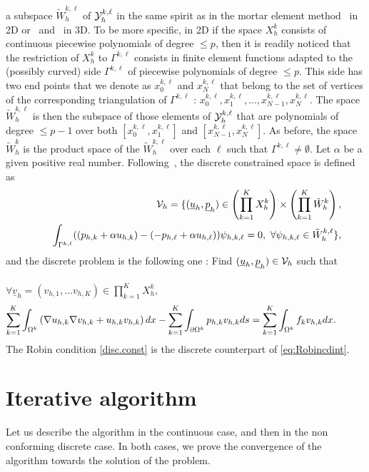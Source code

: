 \documentclass[final]{siamltex}
\begin{document}
a subspace $\tilde W_h^{k,\ell}$ of ${\cal Y}_h^{k,\ell}$ in the same
spirit as in the mortar element method~\cite{BMP} in 2D or~\cite{BBM}
and~\cite{BraessDahmen} in 3D.  To be more
specific, in 2D if the space $X_h^k$ consists of continuous piecewise
polynomials of degree $\le p$, then it is readily noticed that the
restriction of $X_h^k$ to $\Gamma^{k,\ell}$ consists in finite element
functions adapted to the (possibly curved) side $\Gamma^{k,\ell}$ of
piecewise polynomials of degree $\le p$. This side has two end points
that we denote as $x_0^{k,\ell}$ and $x_N^{k,\ell}$ that belong to the
set of vertices of the corresponding triangulation of
$\Gamma^{k,\ell}$ : $x_0^{k,\ell}, x_1^{k,\ell},...,x_{N-1}^{k,\ell},
x_N^{k,\ell}$. The space $\tilde W_h^{k,\ell}$ is then the subspace of
those elements of ${\cal Y}_h^{k,\ell}$ that are polynomials of degree
$\le p-1$ over both $[x_0^{k,\ell}, x_1^{k,\ell}]$ and
$[x_{N-1}^{k,\ell}, x_N^{k,\ell}]$.  As before, the space $\tilde
W_h^{k}$ is the product space of the $\tilde W_h^{k,\ell}$ over each
$\ell$ such that $\Gamma^{k,\ell}\not=\emptyset$.  
Let $\alpha$ be a given positive  real number.
Following~\cite{JMN10}, the discrete constrained space is defined as
\begin{eqnarray}
\label{disc.const}
{\cal V}_h =  {\displaystyle}\lbrace({{\underline u}}_h,{{\underline p}}_h)\in
\left(\prod_{k=1}^K X_h^k\right)\times
\left(\prod_{k=1}^K \tilde W_h^{k}\right), \nonumber\\
\ \qquad\int_{\Gamma^{k,\ell}}((p_{h,k}+\alpha u_{h,k})-(-p_{h,\ell}+\alpha
u_{h,\ell})
)\psi_{h,k,\ell}
= 0,\
\forall \psi_{h,k,\ell} \in \tilde W_h^{k,\ell}
\rbrace,
\end{eqnarray}
and the discrete problem is the following one :
Find $({{\underline u}}_h,{{\underline p}}_h) \in {\cal V}_h$ such that\\\\
$\forall {{\underline v}}_h=(v_{h,1},...v_{h,K}) \in \prod_{k=1}^K X_h^k,$
\begin{eqnarray}\label{pbdiscret}
\sum_{k=1}^{K} \int_{\Omega^k} \left( \nabla u_{h,k}\nabla v_{h,k} +u_{h,k}
v_{h,k} \right) dx
- \sum_{k=1}^{K} \int_{\partial\Omega^k} p_{h,k} v_{h,k} ds
= \sum_{k=1}^{K} \int_{\Omega^k} f_k v_{h,k} dx.\hspace{10mm}
\end{eqnarray}
The Robin condition \eqref{disc.const} is the discrete counterpart of \eqref{eq:Robincdint}.
\section{Iterative algorithm}\label{sec.algo}
Let us describe the algorithm in the continuous case, and then in the
non conforming discrete case. In both cases, we prove the convergence
of the algorithm towards the solution of the problem.
\end{document}
